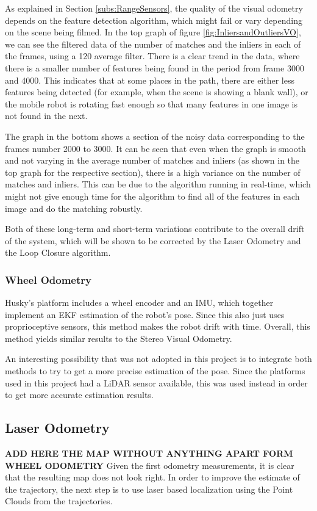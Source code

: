 \documentclass[11pt]{article}
\begin{document}
As explained in Section \ref{subs:RangeSensors}, the quality of the visual odometry depends on the feature detection algorithm, which might fail or vary depending on the scene being filmed. In the top graph of figure \ref{fig:InliersandOutliersVO}, we can see the filtered data of the number of matches and the inliers in each of the frames, using a 120 average filter. There is a clear trend in the data, where there is a smaller number of features being found in the period from frame 3000 and 4000. This indicates that at some places in the path, there are either less features being detected (for example, when the scene is showing a blank wall), or the mobile robot is rotating fast enough so that many features in one image is not found in the next.

The graph in the bottom shows a section of the noisy data corresponding to the frames number 2000 to 3000. It can be seen that even when the graph is smooth and not varying in the average number of matches and inliers (as shown in the top graph for the respective section), there is a high variance on the number of matches and inliers. This can be due to the algorithm running in real-time, which might not give enough time for the algorithm to find all of the features in each image and do the matching robustly.

Both of these long-term and short-term variations contribute to the overall drift of the system, which will be shown to be corrected by the Laser Odometry and the Loop Closure algorithm.




	
	
	\subsubsection*{Wheel Odometry}

Husky's platform includes a wheel encoder and an IMU, which together implement an EKF estimation of the robot's pose. Since this also just uses proprioceptive sensors, this method makes the robot drift with time. Overall, this method yields similar results to the Stereo Visual Odometry.

An interesting possibility that was not adopted in this project is to integrate both methods to try to get a more precise estimation of the pose. Since the platforms used in this project had a LiDAR sensor available, this was used instead in order to get more accurate estimation results.

	\subsection{Laser Odometry}
	\label{subs:LaserOd}
\textbf{ADD HERE THE MAP WITHOUT ANYTHING APART FORM WHEEL ODOMETRY}
Given the first odometry measurements, it is clear that the resulting map does not look right. In order to improve the estimate of the trajectory, the next step is to use laser based localization using the Point Clouds from the trajectories.
	
\end{document}
